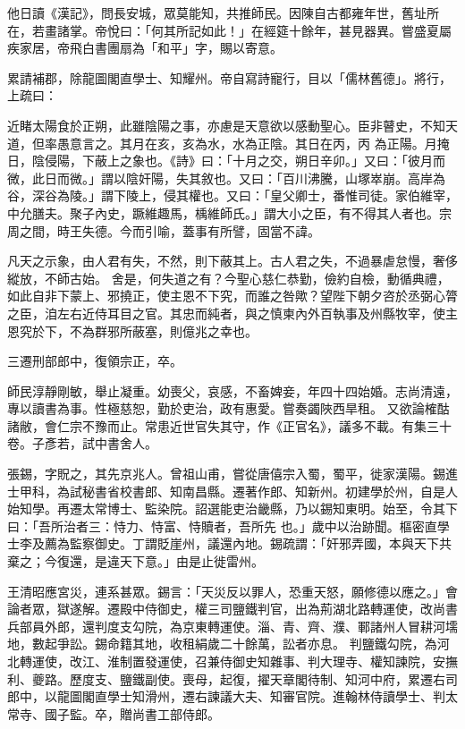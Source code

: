 \begin{pinyinscope}
 他日讀《漢記》，問長安城，眾莫能知，共推師民。因陳自古都雍年世，舊址所在，若畫諸掌。帝悅曰：「何其所記如此！」在經筵十餘年，甚見器異。嘗盛夏屬疾家居，帝飛白書團扇為「和平」字，賜以寄意。



 累請補郡，除龍圖閣直學士、知耀州。帝自寫詩寵行，目以「儒林舊德」。將行，上疏曰：



 近睹太陽食於正朔，此雖陰陽之事，亦慮是天意欲以感動聖心。臣非瞽史，不知天道，但率愚意言之。其月在亥，亥為水，水為正陰。其日在丙，丙
 為正陽。月掩日，陰侵陽，下蔽上之象也。《詩》曰：「十月之交，朔日辛卯。」又曰：「彼月而微，此日而微。」謂以陰奸陽，失其敘也。又曰：「百川沸騰，山塚崒崩。高岸為谷，深谷為陵。」謂下陵上，侵其權也。又曰：「皇父卿士，番惟司徒。家伯維宰，中允膳夫。聚子內史，蹶維趣馬，楀維師氏。」謂大小之臣，有不得其人者也。宗周之間，時王失德。今而引喻，蓋事有所譬，固當不諱。



 凡天之示象，由人君有失，不然，則下蔽其上。古人君之失，不過暴虐怠慢，奢侈縱放，不師古始。
 舍是，何失道之有？今聖心慈仁恭勤，儉約自檢，動循典禮，如此自非下蒙上、邪撓正，使主恩不下究，而誰之咎歟？望陛下朝夕咨於丞弼心膂之臣，洎左右近侍耳目之官。其忠而純者，與之慎柬內外百執事及州縣牧宰，使主恩究於下，不為群邪所蔽塞，則億兆之幸也。



 三遷刑部郎中，復領宗正，卒。



 師民淳靜剛敏，舉止凝重。幼喪父，哀感，不畜婢妾，年四十四始婚。志尚清遠，專以讀書為事。性極慈恕，勤於吏治，政有惠愛。嘗奏蠲陜西旱租。
 又欲論榷酤諸敝，會仁宗不豫而止。常患近世官失其守，作《正官名》，議多不載。有集三十卷。子彥若，試中書舍人。



 張錫，字貺之，其先京兆人。曾祖山甫，嘗從唐僖宗入蜀，蜀平，徙家漢陽。錫進士甲科，為試秘書省校書郎、知南昌縣。遷著作郎、知新州。初建學於州，自是人始知學。再遷太常博士、監染院。詔選能吏治畿縣，乃以錫知東明。始至，令其下曰：「吾所治者三：恃力、恃富、恃贖者，吾所先
 也。」歲中以治跡聞。樞密直學士李及薦為監察御史。丁謂貶崖州，議還內地。錫疏謂：「奸邪弄國，本與天下共棄之；今復還，是違天下意。」由是止徙雷州。



 王清昭應宮災，連系甚眾。錫言：「天災反以罪人，恐重天怒，願修德以應之。」會論者眾，獄遂解。遷殿中侍御史，權三司鹽鐵判官，出為荊湖北路轉運使，改尚書兵部員外郎，還判度支勾院，為京東轉運使。淄、青、齊、濮、鄆諸州人冒耕河壖地，數起爭訟。錫命籍其地，收租絹歲二十餘萬，訟者亦息。
 判鹽鐵勾院，為河北轉運使，改江、淮制置發運使，召兼侍御史知雜事、判大理寺、權知諫院，安撫利、夔路。歷度支、鹽鐵副使。喪母，起復，擢天章閣待制、知河中府，累遷右司郎中，以龍圖閣直學士知滑州，遷右諫議大夫、知審官院。進翰林侍讀學士、判太常寺、國子監。卒，贈尚書工部侍郎。




\end{pinyinscope}

